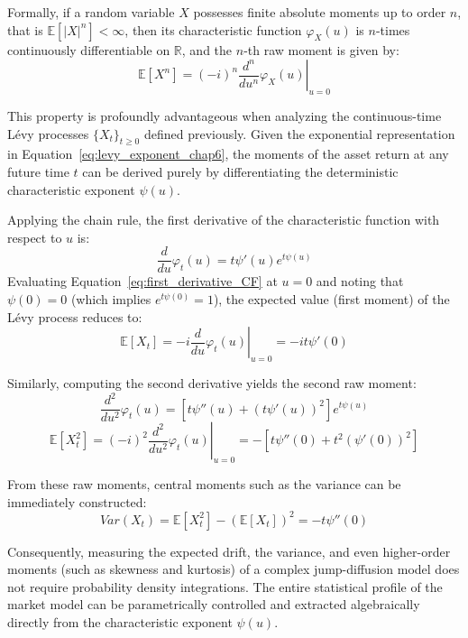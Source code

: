 Formally, if a random variable $X$ possesses finite absolute moments up to order $n$, that is $\mathbb{E}[|X|^n] < \infty$, then its characteristic function $\varphi_X(u)$ is $n$-times continuously differentiable on $\mathbb{R}$, and the $n$-th raw moment is given by:
\begin{equation}
    \mathbb{E}[X^n] = (-i)^n \left. \frac{d^n}{du^n} \varphi_X(u) \right|_{u=0}
\end{equation}

This property is profoundly advantageous when analyzing the continuous-time L\'evy processes $\{X_t\}_{t \ge 0}$ defined previously. Given the exponential representation in Equation~\eqref{eq:levy_exponent_chap6}, the moments of the asset return at any future time $t$ can be derived purely by differentiating the deterministic characteristic exponent $\psi(u)$. 

Applying the chain rule, the first derivative of the characteristic function with respect to $u$ is:
\begin{equation}\label{eq:first_derivative_CF}
    \frac{d}{du} \varphi_t(u) = t \psi'(u) e^{t\psi(u)}
\end{equation}
Evaluating Equation~\eqref{eq:first_derivative_CF} at $u=0$ and noting that $\psi(0) = 0$ (which implies $e^{t\psi(0)} = 1$), the expected value (first moment) of the L\'evy process reduces to:
\begin{equation}
    \mathbb{E}[X_t] = -i \left. \frac{d}{du} \varphi_t(u) \right|_{u=0} = -i t \psi'(0)
\end{equation}

Similarly, computing the second derivative yields the second raw moment:
\begin{equation}
    \frac{d^2}{du^2} \varphi_t(u) = \left[ t \psi''(u) + \left( t \psi'(u) \right)^2 \right] e^{t\psi(u)}
\end{equation}
\begin{equation}
    \mathbb{E}[X_t^2] = (-i)^2 \left. \frac{d^2}{du^2} \varphi_t(u) \right|_{u=0} = - \left[ t \psi''(0) + t^2 (\psi'(0))^2 \right]
\end{equation}

From these raw moments, central moments such as the variance can be immediately constructed:
\begin{equation}
    Var(X_t) = \mathbb{E}[X_t^2] - (\mathbb{E}[X_t])^2 = -t \psi''(0)
\end{equation}

Consequently, measuring the expected drift, the variance, and even higher-order moments (such as skewness and kurtosis) of a complex jump-diffusion model does not require probability density integrations. The entire statistical profile of the market model can be parametrically controlled and extracted algebraically directly from the characteristic exponent $\psi(u)$.
